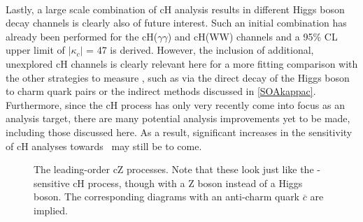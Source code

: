 \\
Lastly, a large scale combination of cH analysis results in different Higgs boson decay channels is clearly also of future interest. Such an initial combination has already been performed for the cH($\gamma\gamma$) and cH(WW) channels and a 95\% CL upper limit of $\mid$$\kappa_c$$\mid$ = 47 is derived. However, the inclusion of additional, unexplored cH channels is clearly relevant here for a more fitting comparison with the other strategies to measure \kappac, such as via the direct decay of the Higgs boson to charm quark pairs or the indirect methods discussed in \autoref{SOAkappac}. Furthermore, since the cH process has only very recently come into focus as an analysis target, there are many potential analysis improvements yet to be made, including those discussed here. As a result, significant increases in the sensitivity of cH analyses towards \kappac\, may still be to come. 

\begin{figure}
\begin{subfigure}{.5\textwidth}
    \centering
\end{subfigure}
\begin{subfigure}{.5\textwidth}
    \centering
\end{subfigure}%
\caption{The leading-order cZ processes. Note that these look just like the \kappac-sensitive cH process, though with a Z boson instead of a Higgs boson. The corresponding diagrams with an anti-charm quark $\overline{c}$ are implied.}
\label{fig:cZFeynman}
\end{figure}



